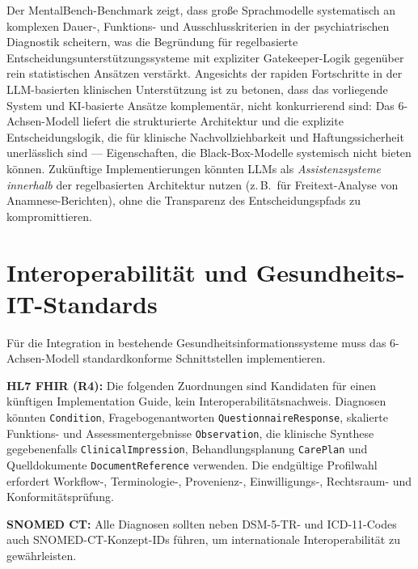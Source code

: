 \documentclass[11pt,a4paper]{article}
\begin{document}
Der MentalBench-Benchmark \citep{Song2026MentalBench} zeigt, dass gro\ss{}e Sprachmodelle systematisch an komplexen Dauer-, Funktions- und Ausschlusskriterien in der psychiatrischen Diagnostik scheitern, was die Begr\"undung f\"ur regelbasierte Entscheidungsunterst\"utzungssysteme mit expliziter Gatekeeper-Logik gegen\"uber rein statistischen Ans\"atzen verst\"arkt. Angesichts der rapiden Fortschritte in der LLM-basierten klinischen Unterst\"utzung ist zu betonen, dass das vorliegende System und KI-basierte Ans\"atze komplement\"ar, nicht konkurrierend sind: Das 6-Achsen-Modell liefert die strukturierte Architektur und die explizite Entscheidungslogik, die f\"ur klinische Nachvollziehbarkeit und Haftungssicherheit unerl\"asslich sind --- Eigenschaften, die Black-Box-Modelle systemisch nicht bieten k\"onnen. Zuk\"unftige Implementierungen k\"onnten LLMs als \textit{Assistenzsysteme innerhalb} der regelbasierten Architektur nutzen (z.\,B.\ f\"ur Freitext-Analyse von Anamnese-Berichten), ohne die Transparenz des Entscheidungspfads zu kompromittieren.


\section{Interoperabilit\"at und Gesundheits-IT-Standards}
\label{sec:interop}

F\"ur die Integration in bestehende Gesundheitsinformationssysteme muss das 6-Achsen-Modell standardkonforme Schnittstellen implementieren.

\textbf{HL7 FHIR (R4):} Die folgenden Zuordnungen sind Kandidaten f\"ur einen k\"unftigen Implementation Guide, kein Interoperabilit\"atsnachweis. Diagnosen k\"onnten \nolinkurl{Condition}, Fragebogenantworten \nolinkurl{QuestionnaireResponse}, skalierte Funktions- und Assessmentergebnisse \nolinkurl{Observation}, die klinische Synthese gegebenenfalls \nolinkurl{ClinicalImpression}, Behandlungsplanung \nolinkurl{CarePlan} und Quelldokumente \nolinkurl{DocumentReference} verwenden. Die endg\"ultige Profilwahl erfordert Workflow-, Terminologie-, Provenienz-, Einwilligungs-, Rechtsraum- und Konformit\"atspr\"ufung.

\textbf{SNOMED CT:} Alle Diagnosen sollten neben DSM-5-TR- und ICD-11-Codes auch SNOMED-CT-Konzept-IDs f\"uhren, um internationale Interoperabilit\"at zu gew\"ahrleisten.
\end{document}
